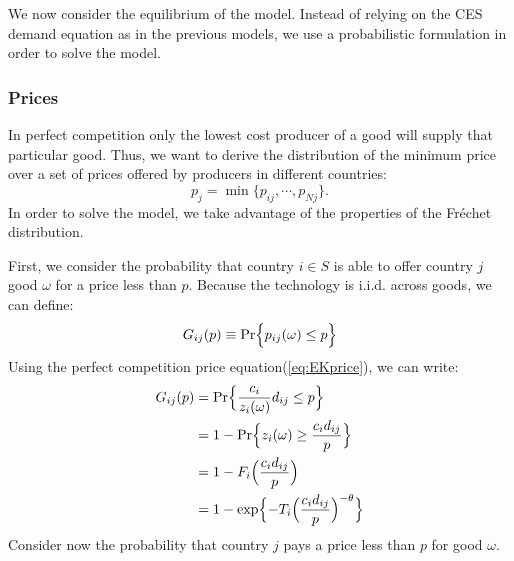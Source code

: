 We now consider the equilibrium of the model. Instead of relying on the CES demand
equation as in the previous models, we use a probabilistic formulation in order to solve
the model.

\subsubsection{Prices}

In perfect competition only the lowest cost producer of a good will supply that particular
good. Thus, we want to derive the distribution of the minimum price over a set of prices
offered by producers in different countries:
\[
p_j = \min \{p_{ij}, \cdots, p_{Nj} \}.
\]
In order to solve the model, we take advantage of the properties of the Fréchet distribution.

First, we consider the probability that country $i \in S$ is able to offer country $j$ good $\omega$
for a price less than $p$. Because the technology is i.i.d. across goods, we can define:
\begin{gather*}
    G_{ij}(p) \equiv \operatorname{Pr} \Bigl\{ p_{ij}(\omega) \leq p \Bigr\}
\end{gather*}
Using the perfect competition price equation(\ref{eq:EKprice}), we can write:
\begin{align*}
    G_{ij}(p) &= \operatorname{Pr} \Bigl\{ \frac{c_i}{z_i(\omega)} d_{ij} \leq p \Bigr\} \\
    &= 1 - \operatorname{Pr} \Bigl\{ z_i(\omega) \geq \frac{c_i d_{ij}}{p} \Bigr\} \\
    &= 1 - F_i \Bigl( \frac{c_i d_{ij}}{p} \Bigr) \\
    &= 1 - \exp \Bigl\{ -T_i \Bigl( \frac{c_i d_{ij}}{p} \Bigr)^{-\theta} \Bigr\}
\end{align*}
Consider now the probability that country $j$ pays a price less than $p$ for good $\omega $.

